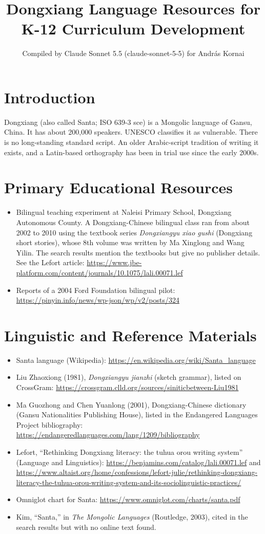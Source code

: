 \documentclass[12pt]{article}
\title{Dongxiang Language Resources for K-12 Curriculum Development}
\author{Compiled by Claude Sonnet 5.5 (claude-sonnet-5-5) for Andr\'as Kornai}
\date{}
\begin{document}
\maketitle

\section{Introduction}
Dongxiang (also called Santa; ISO 639-3 sce) is a Mongolic language of Gansu, China. It has about 200,000 speakers. UNESCO classifies it as vulnerable. There is no long-standing standard script. An older Arabic-script tradition of writing it exists, and a Latin-based orthography has been in trial use since the early 2000s.

\section{Primary Educational Resources}
\begin{itemize}
\item Bilingual teaching experiment at Naleisi Primary School, Dongxiang Autonomous County. A Dongxiang-Chinese bilingual class ran from about 2002 to 2010 using the textbook series \emph{Dongxiangyu xiao gushi} (Dongxiang short stories), whose 8th volume was written by Ma Xinglong and Wang Yilin. The search results mention the textbooks but give no publisher details. See the Lefort article: \url{https://www.jbe-platform.com/content/journals/10.1075/lali.00071.lef}
\item Reports of a 2004 Ford Foundation bilingual pilot: \url{https://pinyin.info/news/wp-json/wp/v2/posts/324}
\end{itemize}

\section{Linguistic and Reference Materials}
\begin{itemize}
\item Santa language (Wikipedia): \url{https://en.wikipedia.org/wiki/Santa_language}
\item Liu Zhaoxiong (1981), \emph{Dongxiangyu jianzhi} (sketch grammar), listed on CrossGram: \url{https://crossgram.clld.org/sources/siniticbetween-Liu1981}
\item Ma Guozhong and Chen Yuanlong (2001), Dongxiang-Chinese dictionary (Gansu Nationalities Publishing House), listed in the Endangered Languages Project bibliography: \url{https://endangeredlanguages.com/lang/1209/bibliography}
\item Lefort, ``Rethinking Dongxiang literacy: the tuhua orou writing system'' (Language and Linguistics): \url{https://benjamins.com/catalog/lali.00071.lef} and \url{https://www.altaist.org/home/confessions/lefort-julie/rethinking-dongxiang-literacy-the-tuhua-orou-writing-system-and-its-sociolinguistic-practices/}
\item Omniglot chart for Santa: \url{https://www.omniglot.com/charts/santa.pdf}
\item Kim, ``Santa,'' in \emph{The Mongolic Languages} (Routledge, 2003), cited in the search results but with no online text found.
\end{itemize}
\end{document}
